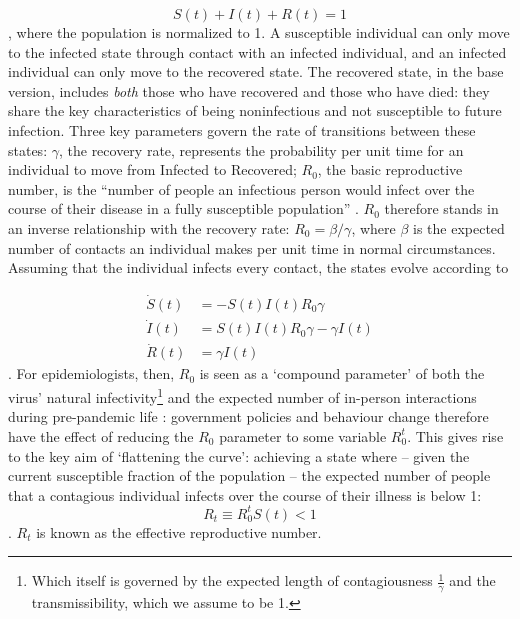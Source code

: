 \documentclass{article}
\begin{document}
\begin{equation}\label{SIRstates}
    S(t) + I(t) + R(t) = 1
\end{equation}
, where the population is normalized to 1. A susceptible individual can only move to the infected state through contact with an infected individual, and an infected individual can only move to the recovered state. The recovered state, in the base version, includes \textit{both} those who have recovered and those who have died: they share the key characteristics of being noninfectious and not susceptible to future infection. Three key parameters govern the rate of transitions between these states: \(\gamma\), the recovery rate, represents the probability per unit time for an individual to move from Infected to Recovered; \(R_0\), the basic reproductive number, is the ``number of people an infectious person would infect over the course of their disease in a fully susceptible population'' \parencite[81]{averyEconomistGuideEpidemiology2020}. \(R_0\) therefore stands in an inverse relationship with the recovery rate: \(R_0 = \beta / \gamma\), where \(\beta\) is the expected number of contacts an individual makes per unit time in normal circumstances. Assuming that the individual infects every contact, the states evolve according to 

\begin{align}
    \dot{S}(t)&= -S(t)I(t)R_0 \gamma \\
    \dot{I}(t)&= S(t)I(t)R_0 \gamma - \gamma I(t) \\
    \dot{R}(t)&= \gamma I(t)
\end{align}
. For epidemiologists, then, \(R_0\) is seen as a `compound parameter' of both the virus' natural infectivity\footnote{Which itself is governed by the expected length of contagiousness \(\frac{1}{\gamma}\) and the transmissibility, which we assume to be 1.} and the expected number of in-person interactions during pre-pandemic life \parencite[84]{averyEconomistGuideEpidemiology2020}: government policies and behaviour change therefore have the effect of reducing the \(R_0\) parameter to some variable \(R^t_0\). This gives rise to the key aim of `flattening the curve': achieving a state where -- given the current susceptible fraction of the population -- the expected number of people that a contagious individual infects over the course of their illness is below 1:
\begin{equation}
    R_t \equiv R^t_0 S(t) < 1
\end{equation}. \(R_t\) is known as the effective reproductive number.
\end{document}
